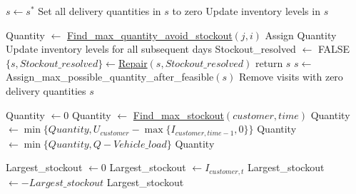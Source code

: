 \documentclass{article}
\begin{document}
\begin{algorithm}[H]
\caption{\textbf{Destory\_And\_Rebalance$(s^*)$}} \label{alg: destroy and rebalance}
\begin{algorithmic}[1]
\STATE $s \gets s^*$
\STATE Set all delivery quantities in $s$ to zero
\STATE Update inventory levels in $s$

            \STATE Quantity $\gets $ \hyperref[alg:FindMaxQuantityAvoidStockout]{Find\_max\_quantity\_avoid\_stockout}$(j, i)$
            \STATE Assign Quantity
            \STATE Update inventory levels for all subsequent days
        \ENDIF
    \ENDFOR
\ENDFOR
\STATE Stockout\_resolved $\gets$ FALSE
\STATE $\{s,Stockout\_resolved\}\gets $\hyperref[alg:QunatityRepair]{Repair}$(s,Stockout\_resolved)$
    \STATE return $s$
\ENDIF
\STATE $s\gets$Assign\_max\_possible\_quantity\_after\_feasible$(s)$
\STATE Remove visits with zero delivery quantities
\RETURN $s$
\end{algorithmic}
\end{algorithm}


\begin{algorithm}[H]
\caption{\textbf{Find\_max\_quantity\_avoid\_stockout$(customer, time)$}} \label{alg:FindMaxQuantityAvoidStockout}
\begin{algorithmic}[1]
\STATE Quantity $\gets 0$
\STATE Quantity $\gets$ \hyperref[alg:FindMaxStockout]{Find\_max\_stockout}$(customer, time)$
\STATE Quantity  $\gets \min\{Quantity, U_{customer} - \max\{I_{customer,time-1},0\}\}$ 
\STATE Quantity $\gets \min \{Quantity, Q - Vehicle\_load\} $
\RETURN Quantity
\end{algorithmic}
\end{algorithm}

\begin{algorithm}[H]
\caption{\textbf{Find\_max\_stockout$(customer, time)$}} \label{alg:FindMaxStockout}
\begin{algorithmic}[1]
\STATE Largest\_stockout $\gets 0$
        \STATE Largest\_stockout $\gets I_{customer,t}$ 
    \ENDIF
\ENDFOR
\STATE Largest\_stockout $\gets -Largest\_stockout$
\RETURN  Largest\_stockout
\end{algorithmic}
\end{algorithm}
\end{document}
